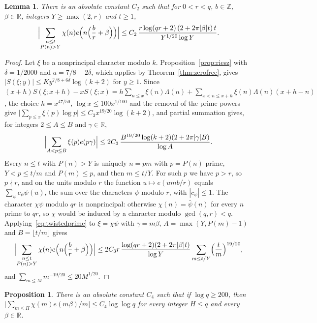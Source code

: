 \documentclass[12pt]{amsart}
\newtheorem{lemma}[theorem]{Lemma}
\newtheorem{proposition}[theorem]{Proposition}
\theoremstyle{remark}
\newcommand{\R}{\mathbb{R}}
\begin{document}
\begin{lemma}\label{lem:major}
There is an absolute constant $C_2$ such that for $0<r<q$, $b\in\mathbb Z$, $\beta\in\R$, integers
$Y\ge\max(2,r)$ and $t\ge1$,
\[
  \Bigl|\sum_{\substack{n\le t\\P(n)>Y}}\chi(n)e\Bigl(n\Bigl(\frac br+\beta\Bigr)\Bigr)\Bigr|
  \le C_2\,\frac{r\log(qr+2)\,(2+2\pi|\beta|t)\,t}{Y^{1/20}\log Y}.
\]
\end{lemma}

\begin{proof}
Let $\xi$ be a nonprincipal character modulo $k$. Proposition~\ref{prop:riesz} with
$\delta=1/2000$ and $a=7/8-2\delta$, which applies by Theorem~\ref{thm:zerofree}, gives
$|S(\xi;y)|\le Ky^{7/8+6\delta}\log(k+2)$ for $y\ge1$. Since
$(x+h)S(\xi;x+h)-xS(\xi;x)=h\sum_{n\le x}\xi(n)\Lambda(n)+\sum_{x<n\le x+h}\xi(n)\Lambda(n)(x+h-n)$,
the choice $h=x^{47/50}$, $\log x\le100x^{1/100}$ and the removal of the prime powers give
$\bigl|\sum_{p\le x}\xi(p)\log p\bigr|\le C_3x^{19/20}\log(k+2)$, and partial summation gives, for
integers $2\le A\le B$ and $\gamma\in\R$,
\begin{equation}\label{eq:twistedprime}
  \Bigl|\sum_{A<p\le B}\xi(p)e(p\gamma)\Bigr|\le
  2C_3\,\frac{B^{19/20}\log(k+2)(2+2\pi|\gamma|B)}{\log A}.
\end{equation}
Every $n\le t$ with $P(n)>Y$ is uniquely $n=pm$ with $p=P(n)$ prime, $Y<p\le t/m$ and
$P(m)\le p$, and then $m\le t/Y$. For such $p$ we have $p>r$, so $p\nmid r$, and on the units
modulo $r$ the function $u\mapsto e(umb/r)$ equals $\sum_\psi c_\psi\psi(u)$, the sum over the
characters $\psi$ modulo $r$, with $|c_\psi|\le1$. The character $\chi\psi$ modulo $qr$ is
nonprincipal: otherwise $\chi(n)=\bar\psi(n)$ for every $n$ prime to $qr$, so $\chi$ would be
induced by a character modulo $\gcd(q,r)<q$. Applying~\eqref{eq:twistedprime} to $\xi=\chi\psi$
with $\gamma=m\beta$, $A=\max(Y,P(m)-1)$ and $B=\lfloor t/m\rfloor$ gives
\[
  \Bigl|\sum_{\substack{n\le t\\P(n)>Y}}\chi(n)e\Bigl(n\Bigl(\frac br+\beta\Bigr)\Bigr)\Bigr|
  \le2C_3r\,\frac{\log(qr+2)(2+2\pi|\beta|t)}{\log Y}\sum_{m\le t/Y}\Bigl(\frac tm\Bigr)^{19/20},
\]
and $\sum_{m\le M}m^{-19/20}\le20M^{1/20}$.
\end{proof}

\begin{proposition}\label{prop:hsum}
There is an absolute constant $C_4$ such that if $\log q\ge200$, then
$\bigl|\sum_{m\le H}\chi(m)e(m\beta)/m\bigr|\le C_4\log\log q$ for every integer $H\le q$ and every
$\beta\in\R$.
\end{proposition}
\end{document}

